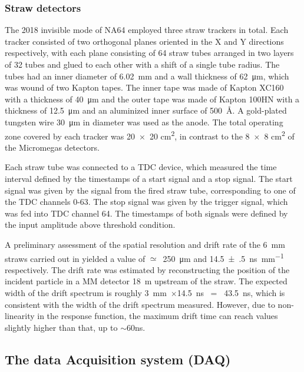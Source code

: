 \subsubsection{Straw detectors}

The 2018 invisible mode of NA64 employed three straw trackers in total. Each tracker consisted of two orthogonal planes oriented in the X and Y directions respectively, with each plane consisting of 64 straw tubes arranged in two layers of 32 tubes and glued to each other with a shift of a single tube radius. The tubes had an inner diameter of \SI{6.02}{\milli\metre} and a wall thickness of \SI{62}{\micro\metre}, which was wound of two Kapton tapes. The inner tape was made of Kapton XC160 with a thickness of \SI{40}{\micro\metre} and the outer tape was made of Kapton 100HN with a thickness of \SI{12.5}{\micro\metre} and an aluminized inner surface of \SI{500}{\angstrom}. A gold-plated tungsten wire 30~μm in diameter was used as the anode. The total operating zone covered by each tracker was \num{20 x 20} \si{\square\centi\metre}, in contrast to the \num{8 x 8} \si{\square\centi\metre} of the Micromegas detectors.

Each straw tube was connected to a TDC device, which measured the time interval defined by the timestamps of a start signal and a stop signal. The start signal was given by the signal from the fired straw tube, corresponding to one of the TDC channels 0-63. The stop signal was given by the trigger signal, which was fed into TDC channel 64. The timestamps of both signals were defined by the input amplitude above threshold condition.

A preliminary assessment of the spatial resolution and drift rate of the 6~mm straws carried out in \cite{Volkov:2019qhb} yielded a value of $\simeq$~\SI{250}{\micro\metre} and \SI[separate-uncertainty = true,per-mode=symbol]{14.5(5)}{\nano\second\per\milli\metre} respectively. The drift rate was estimated by reconstructing the position of the incident particle in a MM detector \SI{18}{\metre} upstream of the straw. The expected width of the drift spectrum is roughly 3~mm~$\times$14.5~ns~ = ~43.5~ns, which is consistent with the width of the drift spectrum measured. However, due to non-linearity in the response function, the maximum drift time can reach values slightly higher than that, up to $\sim$60ns.


\subsection{The data Acquisition system (DAQ)}
\label{ch2:sec:daq}

